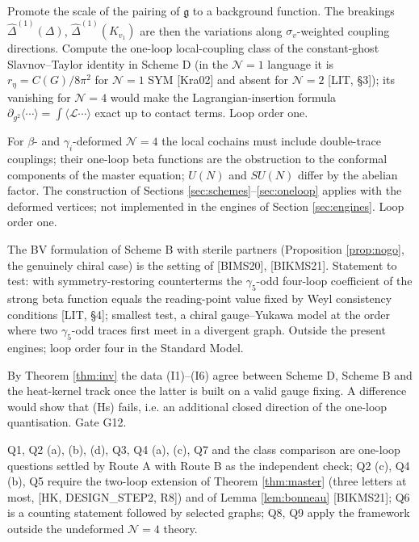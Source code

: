 \begin{problem}
\label{q:Q7}
Promote the scale of the pairing of $\mathfrak g$ to a background function. The breakings $\widehat\Delta^{(1)}(\Delta)$, $\widehat\Delta^{(1)}(K_{v_1})$ are then the variations along $\sigma_v$-weighted coupling directions. Compute the one-loop local-coupling class of the constant-ghost Slavnov--Taylor identity in Scheme D (in the $\mathcal N=1$ language it is $r_\eta=C(G)/8\pi^2$ for $\mathcal N=1$ SYM [Kra02] and absent for $\mathcal N=2$ [LIT, §3]); its vanishing for $\mathcal N=4$ would make the Lagrangian-insertion formula $\partial_{g^2}\langle\cdots\rangle=\int\langle\mathscr L\cdots\rangle$ exact up to contact terms. Loop order one.
\end{problem}

\begin{problem}
\label{q:Q8}
For $\beta$- and $\gamma_i$-deformed $\mathcal N=4$ the local cochains must include double-trace couplings; their one-loop beta functions are the obstruction to the conformal components of the master equation; $U(N)$ and $SU(N)$ differ by the abelian factor. The construction of Sections \ref{sec:schemes}--\ref{sec:oneloop} applies with the deformed vertices; not implemented in the engines of Section \ref{sec:engines}. Loop order one.
\end{problem}

\begin{problem}
\label{q:Q9}
The BV formulation of Scheme B with sterile partners (Proposition \ref{prop:nogo}, the genuinely chiral case) is the setting of [BIMS20], [BIKMS21]. Statement to test: with symmetry-restoring counterterms the $\gamma_5$-odd four-loop coefficient of the strong beta function equals the reading-point value fixed by Weyl consistency conditions [LIT, §4]; smallest test, a chiral gauge--Yukawa model at the order where two $\gamma_5$-odd traces first meet in a divergent graph. Outside the present engines; loop order four in the Standard Model.
\end{problem}

\begin{problem}
\label{q:classes}
By Theorem \ref{thm:inv} the data (I1)--(I6) agree between Scheme D, Scheme B and the heat-kernel track once the latter is built on a valid gauge fixing. A difference would show that (Hs) fails, i.e. an additional closed direction of the one-loop quantisation. Gate G12.
\end{problem}

\begin{remark}
Q1, Q2 (a), (b), (d), Q3, Q4 (a), (c), Q7 and the class comparison are one-loop questions settled by Route A with Route B as the independent check; Q2 (c), Q4 (b), Q5 require the two-loop extension of Theorem \ref{thm:master} (three letters at most, [HK, DESIGN\_STEP2, R8]) and of Lemma \ref{lem:bonneau} [BIKMS21]; Q6 is a counting statement followed by selected graphs; Q8, Q9 apply the framework outside the undeformed $\mathcal N=4$ theory.
\end{remark}
